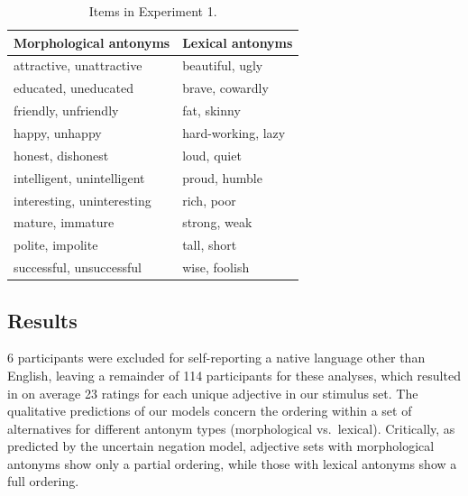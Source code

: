 \documentclass[floatsintext,doc]{apa6}
\begin{document}
\begin{table}[h]
\centering
\begingroup\fontsize{10pt}{11pt}\selectfont
\begin{tabular}{ll}
  \hline
Morphological antonyms & Lexical antonyms \\ 
  \hline
attractive, unattractive & beautiful, ugly \\ 
  educated, uneducated & brave, cowardly \\ 
  friendly, unfriendly & fat, skinny \\ 
  happy, unhappy & hard-working, lazy \\ 
  honest, dishonest & loud, quiet \\ 
  intelligent, unintelligent & proud, humble \\ 
  interesting, uninteresting & rich, poor \\ 
  mature, immature & strong, weak \\ 
  polite, impolite & tall, short \\ 
  successful, unsuccessful & wise, foolish \\ 
   \hline
\end{tabular}
\endgroup
\caption{Items in Experiment 1.} 
\end{table}

\subsection{Results}\label{results}%

6 participants were excluded for self-reporting a native language other than English, leaving a remainder of 114 participants for these analyses, which resulted in on average 23 ratings for each unique adjective in our stimulus set.
The qualitative predictions of our models concern the ordering within a set of alternatives for different antonym types (morphological vs.~lexical).
Critically, as predicted by the uncertain negation model, adjective sets with morphological antonyms show only a partial ordering, while those with lexical antonyms show a full ordering.
\end{document}
